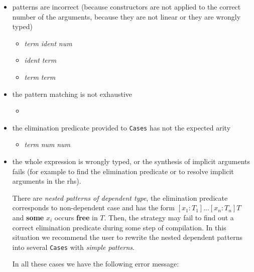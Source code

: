\begin{itemize}
\item patterns are incorrect (because constructors are not applied to
  the correct number of the arguments, because they are not linear or
  they are wrongly typed)
\begin{itemize}
\item {} {\sl term}  {\sl
    ident}  {\sl num} 
  
\item {} {\sl ident}  {\sl term}
  
\item {} {\sl term}  {\sl term}
\end{itemize}

\item the pattern matching is not exhaustive
\begin{itemize}
\item {}
\end{itemize}
\item the elimination predicate provided to \texttt{Cases} has not the
  expected arity

\begin{itemize}
\item {} {\sl term}  {\sl num}  {\sl
    num} 
\end{itemize}

\item the whole expression is wrongly typed, or the synthesis of
  implicit arguments fails (for example to find the elimination
  predicate or to resolve implicit arguments in the rhs).

  
  There are {\em nested patterns of dependent type}, the elimination
  predicate corresponds to non-dependent case and has the form
  $[x_1:T_1]...[x_n:T_n]T$ and {\bf some} $x_i$ occurs {\bf free} in
  $T$.  Then, the strategy may fail to find out a correct elimination
  predicate during some step of compilation.  In this situation we
  recommend the user to rewrite the nested dependent patterns into
  several \texttt{Cases} with {\em simple patterns}.
  
  In all these cases we have the following error message:


\end{itemize}
